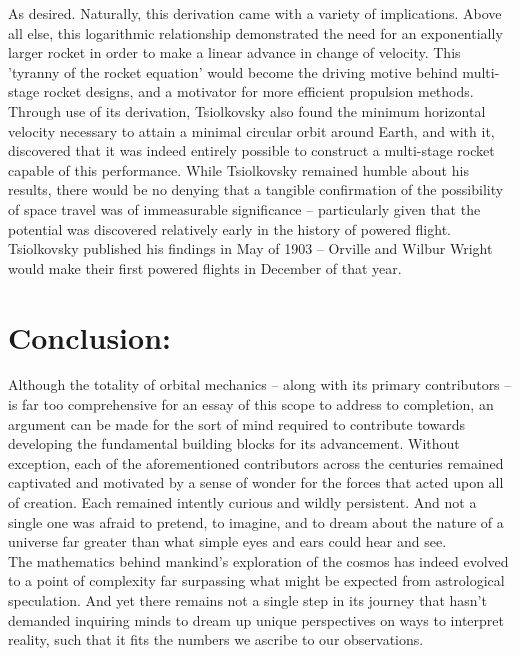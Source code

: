 \documentclass{article}
\begin{document}
As desired. Naturally, this derivation came with a variety of implications. Above all else, this logarithmic relationship demonstrated the need for an exponentially larger rocket in order to make a linear advance in change of velocity. This 'tyranny of the rocket equation' would become the driving motive behind multi-stage rocket designs, and a motivator for more efficient propulsion methods. Through use of its derivation, Tsiolkovsky also found the minimum horizontal velocity necessary to attain a minimal circular orbit around Earth, and with it, discovered that it was indeed entirely possible to construct a multi-stage rocket capable of this performance. While Tsiolkovsky remained humble about his results, there would be no denying that a tangible confirmation of the possibility of space travel was of immeasurable significance -- particularly given that the potential was discovered relatively early in the history of powered flight. Tsiolkovsky published his findings in May of 1903 --  Orville and Wilbur Wright would make their first powered flights in December of that year.    \\

\section{Conclusion:}

Although the totality of orbital mechanics -- along with its primary contributors -- is far too comprehensive for an essay of this scope to address to completion, an argument can be made for the sort of mind required to contribute towards developing the fundamental building blocks for its advancement.  Without exception, each of the aforementioned contributors across the centuries remained captivated and motivated by a sense of wonder for the forces that acted upon all of creation. Each remained intently curious and wildly persistent. And not a single one was afraid to pretend, to imagine, and to dream about the nature of a universe far greater than what simple eyes and ears could hear and see. \\

The mathematics behind mankind's exploration of the cosmos has indeed evolved to a point of complexity far surpassing what might be expected from astrological speculation. And yet there remains not a single step in its journey that hasn't demanded inquiring minds to dream up unique perspectives on ways to interpret reality, such that it fits the numbers we ascribe to our observations. 

\newpage


\end{document}
